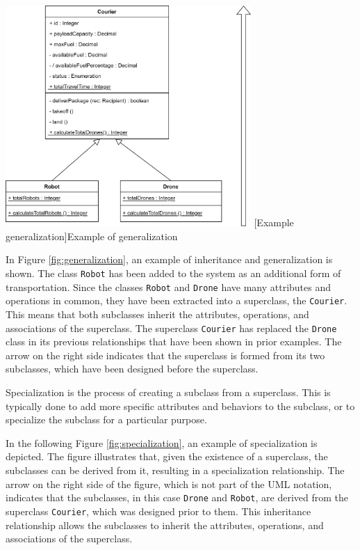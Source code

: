 \documentclass[
	12pt,
    a4paper,
    egregdoesnotlikesansseriftitles, %
    toc=chapterentrywithdots,
    oneside, openany,
    titlepage,
    parskip=half,
    headings=normal,  %
    listof=totoc,
    bibliography=totocnumbered,
    index=totoc,
    captions=tableheading,  %
    listof=flat,
    numbers=noenddot, %
    final]
    {scrbook}
\begin{document}
\vspace{1em}
\begin{minipage}{\linewidth}
	\centering
	\includegraphics[width=0.7\textwidth]{figures/inheritance/generalization.jpg}
	[Example generalization]{Example of generalization}
	\label{fig:generalization}
\end{minipage}

In Figure \ref{fig:generalization}, an example of inheritance and generalization is shown. 
The class \texttt{Robot} has been added to the system as an additional form of transportation. 
Since the classes \texttt{Robot} and \texttt{Drone} have many attributes and operations in common, they have been extracted into a superclass, the \texttt{Courier}.
This means that both subclasses inherit the attributes, operations, and associations of the superclass. 
The superclass \texttt{Courier} has replaced the \texttt{Drone} class in its previous relationships that have been shown in prior examples.
The arrow on the right side indicates that the superclass is formed from its two subclasses, which have been designed before the superclass.



Specialization is the process of creating a subclass from a superclass. This is typically done to add more specific attributes and behaviors to the subclass, or to specialize the subclass for a particular purpose.

In the following Figure \ref{fig:specialization}, an example of specialization is depicted. The figure illustrates that, given the existence of a superclass, the subclasses can be derived from it, resulting in a specialization relationship. 
The arrow on the right side of the figure, which is not part of the UML notation, indicates that the subclasses, in this case \texttt{Drone} and \texttt{Robot}, are derived from the superclass \texttt{Courier}, which was designed prior to them. 
This inheritance relationship allows the subclasses to inherit the attributes, operations, and associations of the superclass.
\end{document}
